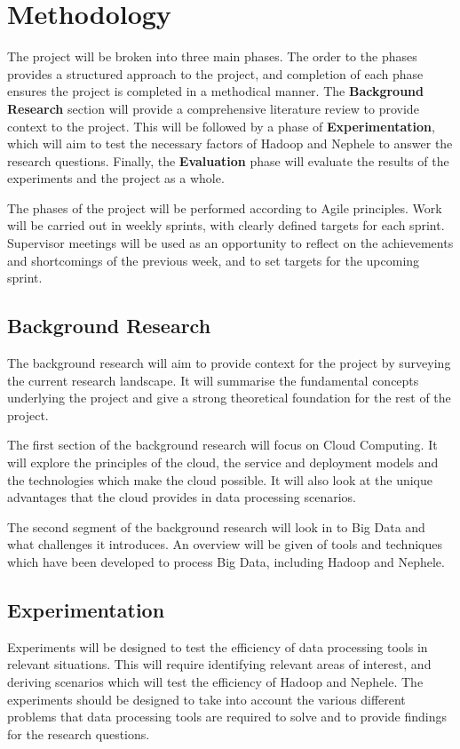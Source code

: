 \section{Methodology}
The project will be broken into three main phases. The order to the phases provides a structured approach to the project, and completion of each phase ensures the project is completed in a methodical manner. The \textbf{Background Research} section will provide a comprehensive literature review to provide context to the project. This will be followed by a phase of \textbf{Experimentation}, which will aim to test the necessary factors of Hadoop and Nephele to answer the research questions. Finally, the \textbf{Evaluation} phase will evaluate the results of the experiments and the project as a whole.

The phases of the project will be performed according to Agile principles. Work will be carried out in weekly sprints, with clearly defined targets for each sprint. Supervisor meetings will be used as an opportunity to reflect on the achievements and shortcomings of the previous week, and to set targets for the upcoming sprint.

\subsection{Background Research}
The background research will aim to provide context for the project by surveying the current research landscape. It will summarise the fundamental concepts underlying the project and give a strong theoretical foundation for the rest of the project.

The first section of the background research will focus on Cloud Computing. It will explore the principles of the cloud, the service and deployment models and the technologies which make the cloud possible. It will also look at the unique advantages that the cloud provides in data processing scenarios.

The second segment of the background research will look in to Big Data and what challenges it introduces. An overview will be given of tools and techniques which have been developed to process Big Data, including Hadoop and Nephele.

\subsection{Experimentation}
Experiments will be designed to test the efficiency of data processing tools in relevant situations. This will require identifying relevant areas of interest, and deriving scenarios which will test the efficiency of Hadoop and Nephele. The experiments should be designed to take into account the various different problems that data processing tools are required to solve and to provide findings for the research questions.

